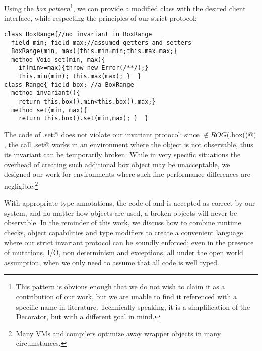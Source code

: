 Using the \emph{box pattern}\footnote{
This pattern is obvious enough that we do not wish to claim it as a contribution of our work,
but we are unable to find it referenced with a specific name in literature. Technically speaking, it is a simplification of the Decorator, but with a different goal in mind.}, we can provide a modified
\Q@Range@ class with the desired client interface, while respecting the principles of our strict protocol:
\begin{lstlisting}
class BoxRange{//no invariant in BoxRange
  field min; field max;//assumed getters and setters
  BoxRange(min, max){this.min=min;this.max=max;}
  method Void set(min, max){
    if(min>=max){throw new Error(/**/);}
    this.min(min); this.max(max); }  }
class Range{ field box; //a BoxRange
  method invariant(){
    return this.box().min<this.box().max;}
  method set(min, max){
    return this.box().set(min,max); }  }
\end{lstlisting}
The code of \Q@Range.set@ does not violate our invariant protocol:
  since \Q@this@ $\notin \mathit{ROG}($\Q@this.box()@$)$, the call
\Q@BoxRange.set@ works in an environment where the \Q@Range@ object is
not observable, thus its invariant can be temporarily broken.
While in very specific situations the overhead of creating such additional box object may be unacceptable, 
we designed our work for environments where such fine performance differences are negligible.\footnote{
Many VMs and compilers optimize away wrapper objects in many circumstances.\cite{help}}

With appropriate type annotations, the code of \Q@Range@ and \Q@BoxRange@ is accepted as correct by our system, and no matter how \Q@Range@ objects are used, a broken \Q@Range@ objects will never be observable.
In the reminder of this work, we discuss how to combine runtime checks, object capabilities  and
type modifiers to create a convenient language where our strict invariant protocol can
be soundly enforced; even in the presence of mutations, I/O, non
determinism and exceptions, all under the open world assumption, when
we only need to assume that all code is well typed.

